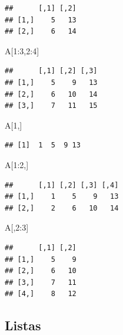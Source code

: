 \documentclass[
]{book}
\newenvironment{Shaded}{\begin{snugshade}}{\end{snugshade}}
\newcommand{\DecValTok}[1]{\textcolor[rgb]{0.00,0.00,0.81}{#1}}
\newcommand{\NormalTok}[1]{#1}
\newcommand{\SpecialCharTok}[1]{\textcolor[rgb]{0.00,0.00,0.00}{#1}}
\begin{document}
\begin{verbatim}
##      [,1] [,2]
## [1,]    5   13
## [2,]    6   14
\end{verbatim}

\begin{Shaded}
\begin{Highlighting}[]
\NormalTok{A[}\DecValTok{1}\SpecialCharTok{:}\DecValTok{3}\NormalTok{,}\DecValTok{2}\SpecialCharTok{:}\DecValTok{4}\NormalTok{]}
\end{Highlighting}
\end{Shaded}

\begin{verbatim}
##      [,1] [,2] [,3]
## [1,]    5    9   13
## [2,]    6   10   14
## [3,]    7   11   15
\end{verbatim}

\begin{Shaded}
\begin{Highlighting}[]
\NormalTok{A[}\DecValTok{1}\NormalTok{,]}
\end{Highlighting}
\end{Shaded}

\begin{verbatim}
## [1]  1  5  9 13
\end{verbatim}

\begin{Shaded}
\begin{Highlighting}[]
\NormalTok{A[}\DecValTok{1}\SpecialCharTok{:}\DecValTok{2}\NormalTok{,]}
\end{Highlighting}
\end{Shaded}

\begin{verbatim}
##      [,1] [,2] [,3] [,4]
## [1,]    1    5    9   13
## [2,]    2    6   10   14
\end{verbatim}

\begin{Shaded}
\begin{Highlighting}[]
\NormalTok{A[,}\DecValTok{2}\SpecialCharTok{:}\DecValTok{3}\NormalTok{]}
\end{Highlighting}
\end{Shaded}

\begin{verbatim}
##      [,1] [,2]
## [1,]    5    9
## [2,]    6   10
## [3,]    7   11
## [4,]    8   12
\end{verbatim}

\hypertarget{listas}{%
\subsection{Listas}\label{listas}}
\end{document}
